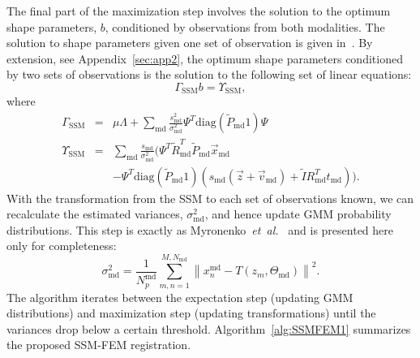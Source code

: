 \documentclass[journal]{IEEEtran}
\newcommand{\trans}[1]{#1^{\scriptscriptstyle T}}
\newcommand{\diag}{\mathrm{diag}}
\begin{document}
The final part of the maximization step involves the solution to the optimum shape parameters, $b$, conditioned by observations from both modalities. The solution to shape parameters given one set of observation is given in~\cite{Rasoulian12b}. By extension, see Appendix~\ref{sec:app2}, the optimum shape parameters conditioned by two sets of observations is the solution to the following set of linear equations:
\begin{equation} \label{eq:SSM1}
\Gamma_{\mathrm{SSM}}b = \Upsilon_\mathrm{SSM},
\end{equation}
where 
\begin{eqnarray} \label{eq:SSM2}
\Gamma_{\mathrm{SSM}} &=& \mu\Lambda + \sum_\mathrm{md}\frac{s^2_\mathrm{md}}{\sigma^2_\mathrm{md}}\trans{\Psi}\diag\left(\tilde{P}_\mathrm{md}1\right)\Psi\\
 \Upsilon_{\mathrm{SSM}} &=& \sum_{\mathrm{md}}\frac{s_\mathrm{md}}{\sigma^2_\mathrm{md}}(\trans{\Psi}\trans{\tilde{R}}_\mathrm{md}\tilde{P}_\mathrm{md}\vec{x}_\mathrm{md}\nonumber\\
 && -\trans{\Psi}\diag\left(\tilde{P}_\mathrm{md}1\right)\left(s_\mathrm{md}(\vec{z}+\vec{v}_\mathrm{md})+\tilde{I}\trans{R}_\mathrm{md}t_\mathrm{md}\right))\nonumber.
\end{eqnarray}
With the transformation from the SSM to each set of observations known, we can recalculate the estimated variances, $\sigma^2_\mathrm{md}$, and hence update GMM probability distributions. This step is exactly as Myronenko~\textit{et~al.}~\cite{Myronenko10a} and is presented here only for completeness:
\begin{equation} \label{eq:max1}
\sigma^2_\mathrm{md} = \frac{1}{N^\mathrm{md}_p}\sum^{M,N_\mathrm{md}}_{m,n=1}\left\|x^{\mathrm{md}}_n-T(z_m,\Theta_\mathrm{md})\right\|^2.
\end{equation}
The algorithm iterates between the expectation step (updating GMM distributions) and maximization step (updating transformations) until the variances drop below a certain threshold. Algorithm~\ref{alg:SSMFEM1} summarizes the proposed SSM-FEM registration.
\end{document}
